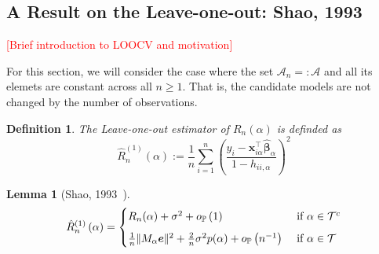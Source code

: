 \documentclass[12pt, letter paper]{article}
\newcommand{\1}{\mathmybb{1}}
\newtheorem{definition}{Definition}[section]
\newtheorem{lemma}[proposition]{Lemma}
\newcommand{\0}{\emptyset}
\newcommand{\prob}{\mathbb{P}}
\newcommand{\paren}[1]{\left(#1 \right)}
\newcommand{\norm}[1]{|\hspace{-1pt}|#1 |\hspace{-1pt}|}
\newcommand{\normsq}[1]{\norm{#1}^{2}}
\newcommand{\Acal}{\mathcal{A}_{n}}
\newcommand{\Tcal}{\mathcal{T}_{n}}
\newcommand{\x}{\boldsymbol{x}}
\newcommand{\e}{\boldsymbol{e}}
\newcommand{\bbetahat}{\boldsymbol{\hat{\beta}}}
\newcommand{\loocv}[1]{\hat{R}^{(1)}_{n}\paren{#1}}
\newcommand{\op}[1]{o_{\prob}\paren{#1}}
\begin{document}
\subsection{A Result on the Leave-one-out: Shao, 1993}
\renewcommand{\Acal}{\mathcal{A}}
\renewcommand{\Tcal}{\mathcal{T}}
\textcolor{red}{[Brief introduction to LOOCV and motivation]}

For this section, we will consider the case where the set \(\Acal_{n}=:\Acal\) and all its elemets are constant across all \(n\geq 1\). That is, the candidate models are not changed by the number of observations.
\begin{definition}
    The Leave-one-out estimator of \(R_{n}(\alpha)\) is definded as
    \[\loocv{\alpha}:= \frac{1}{n}\sum_{i=1}^{n}\paren{\frac{y_{i}-\x_{i\alpha}^{\top}\bbetahat_{\alpha}}{1-h_{ii,\alpha}}}^{2}\]
\end{definition}

\begin{lemma}[Shao, 1993~\cite{shao_1993}]\label{lem:lemmadecomp}
    \begin{equation}\label{eq:lemmadecomp}
    \loocv{\alpha} = \begin{cases}
        R_{n}(\alpha) + \sigma^{2} + \op{1} &\text{ if }\alpha\in\Tcal^{c}\\[2mm]
        \frac{1}{n}\normsq{M_{\alpha}\e} + \frac{2}{n}\sigma^{2}p(\alpha) + \op{n^{-1}} &\text{ if }\alpha\in\Tcal
    \end{cases}
    \end{equation}
\end{lemma}
\end{document}
